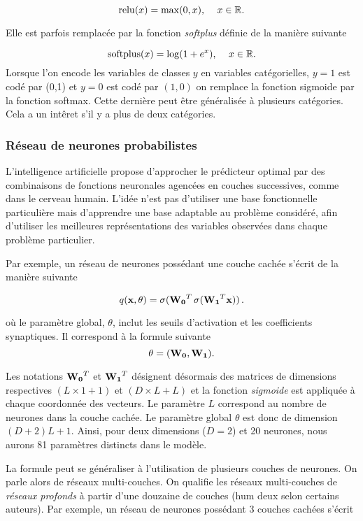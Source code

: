 \documentclass[]{article}
\begin{document}
\[
{\rm relu}(x) = \max(0, x) , \, \quad x \in \mathbb{R}.
\]

Elle est parfois remplacée par la fonction \emph{softplus} définie de la
manière suivante

\[
{\rm softplus}(x) = \log(1 + e^{x}), \, \quad x \in \mathbb{R}.
\] Lorsque l'on encode les variables de classes \(y\) en variables
catégorielles, \(y = 1\) est codé par (0,1) et \(y = 0\) est codé par
\((1,0)\) on remplace la fonction sigmoide par la fonction softmax.
Cette dernière peut être généralisée à plusieurs catégories. Cela a un
intêret s'il y a plus de deux catégories.

\subsubsection{Réseau de neurones
probabilistes}\label{reseau-de-neurones-probabilistes}

L'intelligence artificielle propose d'approcher le prédicteur optimal
par des combinaisons de fonctions neuronales agencées en couches
successives, comme dans le cerveau humain. L'idée n'est pas d'utiliser
une base fonctionnelle particulière mais d'apprendre une base adaptable
au problème considéré, afin d'utiliser les meilleures représentations
des variables observées dans chaque problème particulier.

Par exemple, un réseau de neurones possédant une couche cachée s'écrit
de la manière suivante

\[
 q({\bf x}, {\bf \theta}) = \sigma({\bf W_0}^T \, \sigma({\bf W_1}^T{\bf x}) ) \, .
\]

où le paramètre global, \(\theta\), inclut les seuils d'activation et
les coefficients synaptiques. Il correspond à la formule suivante \[
\theta = ({\bf W_0}, {\bf W_1}).
\]

Les notations \({\bf W_0}^T\) et \({\bf W_1}^T\) désignent désormais des
matrices de dimensions respectives \((L\times 1 + 1)\) et
\((D \times L + L)\) et la fonction \emph{sigmoide} est appliquée à
chaque coordonnée des vecteurs. Le paramètre \(L\) correspond au nombre
de neurones dans la couche cachée. Le paramètre global \(\theta\) est
donc de dimension \((D + 2)L + 1\). Ainsi, pour deux dimensions
(\(D =2\)) et 20 neurones, nous aurons 81 paramètres distincts dans le
modèle.

La formule peut se généraliser à l'utilisation de plusieurs couches de
neurones. On parle alors de réseaux multi-couches. On qualifie les
réseaux multi-couches de \emph{réseaux profonds} à partir d'une douzaine
de couches (hum deux selon certains auteurs). Par exemple, un réseau de
neurones possédant 3 couches cachées s'écrit
\end{document}
